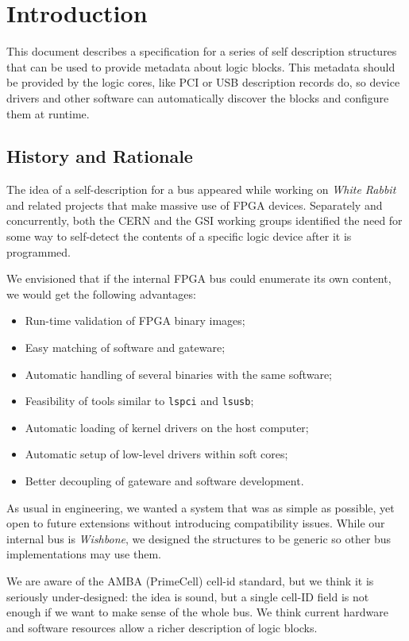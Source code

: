 \documentclass[a4paper, 12pt]{article}
\begin{document}
\section{Introduction}

This document describes a specification for a series of self description
structures that can be used to provide metadata about logic blocks. This metadata
should be provided by the logic cores, like PCI or USB description records do,
so device drivers and other software can automatically discover the blocks and
configure them at runtime.

\subsection{History and Rationale}

The idea of a self-description for a  bus appeared while working on
\textit{White Rabbit} and related projects that make massive use of
FPGA devices. Separately and concurrently, both the CERN and the GSI
working groups identified the need for some way to self-detect the
contents of a specific logic device after it is programmed.

We envisioned that if the internal FPGA bus could enumerate its own
content, we would get the following advantages:

\begin{itemize}
\item Run-time validation of FPGA binary images;
\item Easy matching of software and gateware;
\item Automatic handling of several binaries with the same software;
\item Feasibility of tools similar to \texttt{lspci} and \texttt{lsusb};
\item Automatic loading of kernel drivers on the host computer;
\item Automatic setup of low-level drivers within soft cores;
\item Better decoupling of gateware and software development.
\end{itemize}

As usual in engineering, we wanted a system that was as simple as possible,
yet open to future extensions without introducing compatibility issues.
While our internal bus is \textit{Wishbone}, we designed the structures
to be generic so other bus implementations may use them. 

We are aware of the AMBA (PrimeCell) cell-id standard, but we think it
is seriously under-designed: the idea is sound, but a single cell-ID field
is not enough if we want to make sense of the whole bus. We think current
hardware and software resources allow a richer description of logic blocks.
\end{document}
